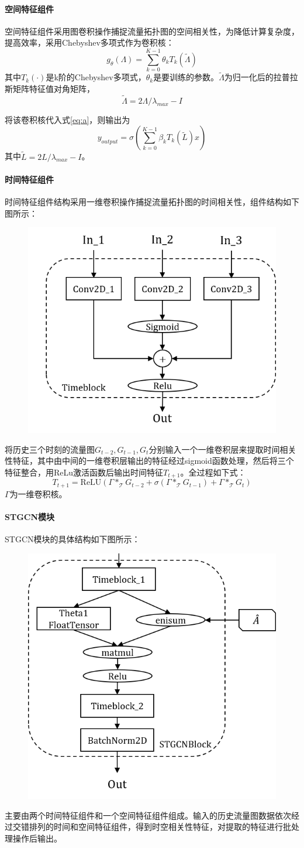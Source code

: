 \documentclass[UTF8]{ctexart}
\numberwithin{equation}{section}
\begin{document}
\paragraph{空间特征组件}
空间特征组件采用图卷积操作捕捉流量拓扑图的空间相关性，为降低计算复杂度，提高效率，采用Chebyshev多项式\cite{bib:four}作为卷积核：
$$
g_{\theta}(\Lambda)=\sum_{k=0}^{K-1}\theta_k T_k(\tilde \Lambda)
$$
其中$T_k(\cdot)$是k阶的Chebyshev多项式，$\theta_k$是要训练的参数。$\tilde \Lambda $为归一化后的拉普拉斯矩阵特征值对角矩阵，
$$ \tilde{\Lambda} = 2\Lambda / \lambda_{max}-I$$

将该卷积核代入式\eqref{eq:a}，则输出为
\begin{equation}
	y_{output}=\sigma(\sum_{k=0}^{K-1}\beta_k T_k(\tilde L)x)
\end{equation}
其中$\tilde{L}=2L/\lambda_{max}-I$。

\paragraph{时间特征组件}
时间特征组件结构采用一维卷积操作捕捉流量拓扑图的时间相关性，组件结构如下图所示：
\begin{figure}[H]
	\centering
	\includegraphics[width=.4\textwidth]{model3.png}
\end{figure}
将历史三个时刻的流量图$G_{t-2},G_{t-1},G_{t}$分别输入一个一维卷积层来提取时间相关性特征，其中由中间的一维卷积层输出的特征经过sigmoid函数处理，然后将三个特征整合，用ReLu激活函数后输出时间特征$T_{t+1}$。全过程如下式：
$$ T_{t+1} = \text{ReLU}(\Gamma *_{\mathcal{T}} G_{t-2}+\sigma(\Gamma *_{\mathcal{T}} G_{t-1})+\Gamma *_{\mathcal{T}} G_{t})$$
$\Gamma$为一维卷积核。

\paragraph{STGCN模块}
STGCN模块的具体结构如下图所示：
\begin{figure}[H]
	\centering
	\includegraphics[width=.4\textwidth]{model2.png}
\end{figure}
主要由两个时间特征组件和一个空间特征组件组成。输入的历史流量图数据依次经过交错排列的时间和空间特征组件，得到时空相关性特征，对提取的特征进行批处理操作后输出。
\end{document}
